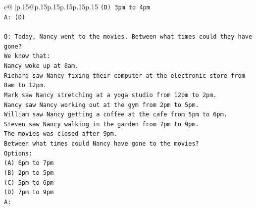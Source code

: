 \documentclass{article}
\begin{document}
{\begin{supertabular}{c@{$\;$}|p{.15\linewidth}@{}p{.15\linewidth}p{.15\linewidth}p{.15\linewidth}p{.15\linewidth}p{.15\linewidth}}
{{{\texttt{(D) 3pm to 4pm} \\
\texttt{A: (D)} \\
\\ 
\texttt{Q: Today, Nancy went to the movies. Between what times could they have gone?} \\
\texttt{We know that:} \\
\texttt{Nancy woke up at 8am.} \\
\texttt{Richard saw Nancy fixing their computer at the electronic store from 8am to 12pm.} \\
\texttt{Mark saw Nancy stretching at a yoga studio from 12pm to 2pm.} \\
\texttt{Nancy saw Nancy working out at the gym from 2pm to 5pm.} \\
\texttt{William saw Nancy getting a coffee at the cafe from 5pm to 6pm.} \\
\texttt{Steven saw Nancy walking in the garden from 7pm to 9pm.} \\
\texttt{The movies was closed after 9pm.} \\
\texttt{Between what times could Nancy have gone to the movies?} \\
\texttt{Options:} \\
\texttt{(A) 6pm to 7pm} \\
\texttt{(B) 2pm to 5pm} \\
\texttt{(C) 5pm to 6pm} \\
\texttt{(D) 7pm to 9pm} \\
\texttt{A:} \\
            }
        }
    }
     \\ \\


\end{supertabular}}
\end{document}
